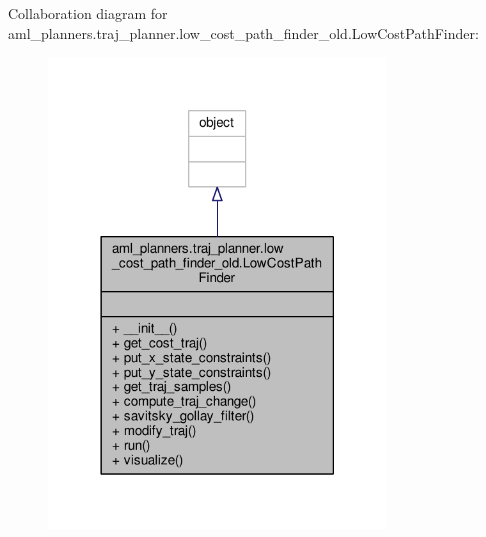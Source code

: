 Collaboration diagram for aml\-\_\-planners.\-traj\-\_\-planner.\-low\-\_\-cost\-\_\-path\-\_\-finder\-\_\-old.\-Low\-Cost\-Path\-Finder\-:
\nopagebreak
\begin{figure}[H]
\begin{center}
\leavevmode
\includegraphics[width=254pt]{classaml__planners_1_1traj__planner_1_1low__cost__path__finder__old_1_1_low_cost_path_finder__coll__graph}
\end{center}
\end{figure}
